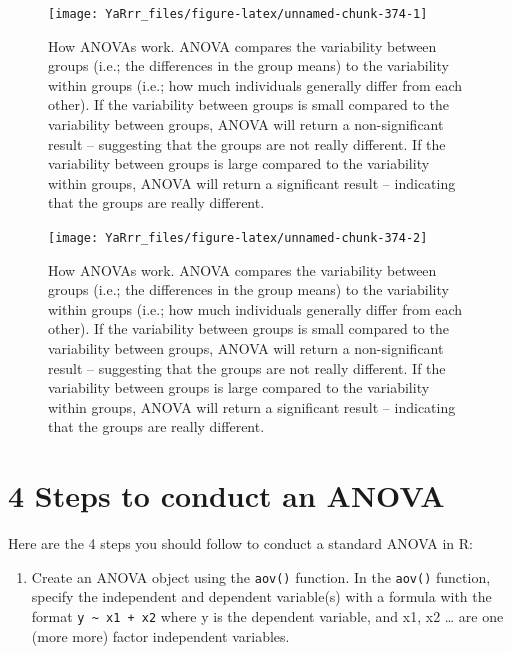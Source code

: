 \documentclass[]{book}
\providecommand{\tightlist}{%
  \setlength{\itemsep}{0pt}\setlength{\parskip}{0pt}}
\theoremstyle{definition}
\theoremstyle{definition}
\theoremstyle{remark}
\begin{document}
\begin{figure}

{\centering \texttt{[image: YaRrr\_files/figure-latex/unnamed-chunk-374-1]} 

}

\caption{How ANOVAs work. ANOVA compares the variability between groups (i.e.; the differences in the group means) to the variability within groups (i.e.; how much individuals generally differ from each other). If the variability between groups is small compared to the variability between groups, ANOVA will return a non-significant result -- suggesting that the groups are not really different. If the variability between groups is large compared to the variability within groups, ANOVA will return a significant result -- indicating that the groups are really different.}\label{fig:unnamed-chunk-3741}
\end{figure}\begin{figure}

{\centering \texttt{[image: YaRrr\_files/figure-latex/unnamed-chunk-374-2]} 

}

\caption{How ANOVAs work. ANOVA compares the variability between groups (i.e.; the differences in the group means) to the variability within groups (i.e.; how much individuals generally differ from each other). If the variability between groups is small compared to the variability between groups, ANOVA will return a non-significant result -- suggesting that the groups are not really different. If the variability between groups is large compared to the variability within groups, ANOVA will return a significant result -- indicating that the groups are really different.}\label{fig:unnamed-chunk-3742}
\end{figure}

\section{4 Steps to conduct an ANOVA}\label{steps-to-conduct-an-anova}

Here are the 4 steps you should follow to conduct a standard ANOVA in R:

\begin{enumerate}
\def\labelenumi{\arabic{enumi}.}
\tightlist
\item
  Create an ANOVA object using the \texttt{aov()} function. In the
  \texttt{aov()} function, specify the independent and dependent
  variable(s) with a formula with the format
  \texttt{y\ \textasciitilde{}\ x1\ +\ x2} where y is the dependent
  variable, and x1, x2 \ldots{} are one (more more) factor independent
  variables.
\end{enumerate}
\end{document}

